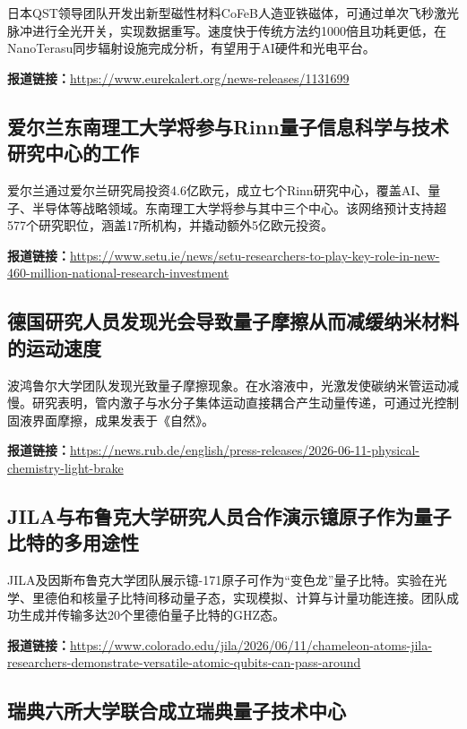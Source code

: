 \documentclass[12pt,a4paper]{ctexart}
\begin{document}
日本QST领导团队开发出新型磁性材料CoFeB人造亚铁磁体，可通过单次飞秒激光脉冲进行全光开关，实现数据重写。速度快于传统方法约1000倍且功耗更低，在NanoTerasu同步辐射设施完成分析，有望用于AI硬件和光电平台。

\noindent\textbf{报道链接：}\url{https://www.eurekalert.org/news-releases/1131699}

\subsection{ 爱尔兰东南理工大学将参与Rinn量子信息科学与技术研究中心的工作 }

爱尔兰通过爱尔兰研究局投资4.6亿欧元，成立七个Rinn研究中心，覆盖AI、量子、半导体等战略领域。东南理工大学将参与其中三个中心。该网络预计支持超577个研究职位，涵盖17所机构，并撬动额外5亿欧元投资。

\noindent\textbf{报道链接：}\url{https://www.setu.ie/news/setu-researchers-to-play-key-role-in-new-460-million-national-research-investment}

\subsection{ 德国研究人员发现光会导致量子摩擦从而减缓纳米材料的运动速度 }

波鸿鲁尔大学团队发现光致量子摩擦现象。在水溶液中，光激发使碳纳米管运动减慢。研究表明，管内激子与水分子集体运动直接耦合产生动量传递，可通过光控制固液界面摩擦，成果发表于《自然》。

\noindent\textbf{报道链接：}\url{https://news.rub.de/english/press-releases/2026-06-11-physical-chemistry-light-brake}

\subsection{ JILA与布鲁克大学研究人员合作演示镱原子作为量子比特的多用途性 }

JILA及因斯布鲁克大学团队展示镱-171原子可作为“变色龙”量子比特。实验在光学、里德伯和核量子比特间移动量子态，实现模拟、计算与计量功能连接。团队成功生成并传输多达20个里德伯量子比特的GHZ态。

\noindent\textbf{报道链接：}\url{https://www.colorado.edu/jila/2026/06/11/chameleon-atoms-jila-researchers-demonstrate-versatile-atomic-qubits-can-pass-around}

\subsection{ 瑞典六所大学联合成立瑞典量子技术中心 }
\end{document}
